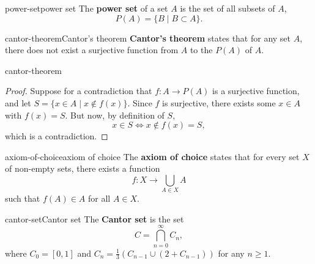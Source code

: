 \begin{topic}{power-set}{power set}
    The \textbf{power set} of a set $A$ is the set of all subsets of $A$,
    \[ P(A) = \{ B \mid B \subset A \} . \]
\end{topic}

\begin{topic}{cantor-theorem}{Cantor's theorem}
    \textbf{Cantor's theorem} states that for any set $A$, there does not exist a surjective function from $A$ to the  $P(A)$ of $A$.
\end{topic}

\begin{example}{cantor-theorem}
    \begin{proof}
        Suppose for a contradiction that $f : A \to P(A)$ is a surjective function, and let $S = \{ x \in A \mid x \not\in f(x) \}$. Since $f$ is surjective, there exists some $x \in A$ with $f(x) = S$. But now, by definition of $S$,
        \[ x \in S \iff x \not\in f(x) = S , \]
        which is a contradiction.
    \end{proof}
\end{example}

\begin{topic}{axiom-of-choice}{axiom of choice}
    The \textbf{axiom of choice} states that for every set $X$ of non-empty sets, there exists a function
    \[ f : X \to \bigcup_{A \in X} A \]
    such that $f(A) \in A$ for all $A \in X$.
\end{topic}

\begin{topic}{cantor-set}{Cantor set}
    The \textbf{Cantor set} is the set
    \[ C = \bigcap_{n = 0}^{\infty} C_n , \]
    where $C_0 = [0, 1]$ and $C_n = \frac{1}{3} \left( C_{n - 1} \cup (2 + C_{n - 1}) \right)$ for any $n \ge 1$.
\end{topic}
